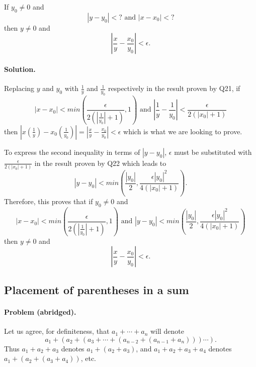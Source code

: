 \documentclass{article}
\begin{document}
If $y_0 \neq 0$ and \begin{equation*}
  |y - y_0| < ? \text{ and } |x - x_0| < ?
\end{equation*} then $y \neq 0$ and \begin{equation*}
  \left|\frac{x}{y} - \frac{x_0}{y_0}\right| < \epsilon.
\end{equation*}

\paragraph{Solution.} Replacing $y$ and $y_0$ with $\frac{1}{y}$ and $\frac{1}{y_0}$ respectively in the result proven by Q21, if \begin{equation*}
  |x - x_0| < min\left(\frac{\epsilon}{2(|\frac{1}{y_0}| + 1)}, 1\right) \text{ and } \left|\frac{1}{y} - \frac{1}{y_0}\right| < \frac{\epsilon}{2(|x_0| + 1)}
\end{equation*} then $|x(\frac{1}{y}) - x_0(\frac{1}{y_0})| = \left|\frac{x}{y} - \frac{x_0}{y_0}\right| < \epsilon$ which is what we are looking to prove.

To express the second inequality in terms of $|y - y_0|$, $\epsilon$ must be substituted with $\frac{\epsilon}{2(|x_0| + 1)}$ in the result proven by Q22 which leads to \begin{equation*}
  |y - y_0| < min\left(\frac{|y_0|}{2}, \frac{\epsilon|y_0|^2}{4(|x_0| + 1)}\right).
\end{equation*} Therefore, this proves that if $y_0 \neq 0$ and \begin{equation*}
  |x - x_0| < min\left(\frac{\epsilon}{2(|\frac{1}{y_0}| + 1)}, 1\right) \text{ and } |y - y_0| < min\left(\frac{|y_0|}{2}, \frac{\epsilon|y_0|^2}{4(|x_0| + 1)}\right)
\end{equation*} then $y \neq 0$ and \begin{equation*}
  \left|\frac{x}{y} - \frac{x_0}{y_0}\right| < \epsilon.
\end{equation*}

\setcounter{subsection}{23}
\subsection{Placement of parentheses in a sum}

\paragraph{Problem (abridged).} Let us agree, for definiteness, that $a_1 + \cdots + a_n$ will denote \begin{equation*}
  a_1 + (a_2 + (a_3 + \cdots + (a_{n-2} + (a_{n-1} + a_n)))\cdots).
\end{equation*} Thus $a_1 + a_2 + a_3$ denotes $a_1 + (a_2 + a_3)$, and $a_1 + a_2 + a_3 + a_4$ denotes $a_1 + (a_2 + (a_3 + a_4))$, etc.
\end{document}
